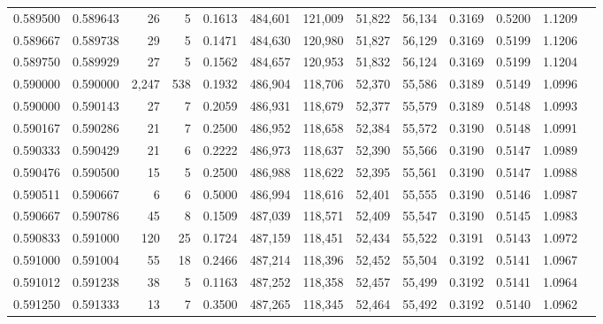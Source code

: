 \begin{tabular}{rrrrrrrrrrrrr}
0.589500 & 0.589643 &    26 &   5 &                                     0.1613 & 484,601 & 121,009 &  51,822 &  56,134 & 0.3169 & 0.5200 & 1.1209 \\
0.589667 & 0.589738 &    29 &   5 &                                     0.1471 & 484,630 & 120,980 &  51,827 &  56,129 & 0.3169 & 0.5199 & 1.1206 \\
0.589750 & 0.589929 &    27 &   5 &                                     0.1562 & 484,657 & 120,953 &  51,832 &  56,124 & 0.3169 & 0.5199 & 1.1204 \\
0.590000 & 0.590000 & 2,247 & 538 &                                     0.1932 & 486,904 & 118,706 &  52,370 &  55,586 & 0.3189 & 0.5149 & 1.0996 \\
0.590000 & 0.590143 &    27 &   7 &                                     0.2059 & 486,931 & 118,679 &  52,377 &  55,579 & 0.3189 & 0.5148 & 1.0993 \\
0.590167 & 0.590286 &    21 &   7 &                                     0.2500 & 486,952 & 118,658 &  52,384 &  55,572 & 0.3190 & 0.5148 & 1.0991 \\
0.590333 & 0.590429 &    21 &   6 &                                     0.2222 & 486,973 & 118,637 &  52,390 &  55,566 & 0.3190 & 0.5147 & 1.0989 \\
0.590476 & 0.590500 &    15 &   5 &                                     0.2500 & 486,988 & 118,622 &  52,395 &  55,561 & 0.3190 & 0.5147 & 1.0988 \\
0.590511 & 0.590667 &     6 &   6 &                                     0.5000 & 486,994 & 118,616 &  52,401 &  55,555 & 0.3190 & 0.5146 & 1.0987 \\
0.590667 & 0.590786 &    45 &   8 &                                     0.1509 & 487,039 & 118,571 &  52,409 &  55,547 & 0.3190 & 0.5145 & 1.0983 \\
0.590833 & 0.591000 &   120 &  25 &                                     0.1724 & 487,159 & 118,451 &  52,434 &  55,522 & 0.3191 & 0.5143 & 1.0972 \\
0.591000 & 0.591004 &    55 &  18 &                                     0.2466 & 487,214 & 118,396 &  52,452 &  55,504 & 0.3192 & 0.5141 & 1.0967 \\
0.591012 & 0.591238 &    38 &   5 &                                     0.1163 & 487,252 & 118,358 &  52,457 &  55,499 & 0.3192 & 0.5141 & 1.0964 \\
0.591250 & 0.591333 &    13 &   7 &                                     0.3500 & 487,265 & 118,345 &  52,464 &  55,492 & 0.3192 & 0.5140 & 1.0962 \\

\end{tabular}
